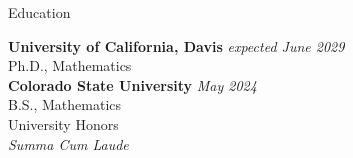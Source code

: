 \documentclass[
	11pt, %
]{resume} %
\begin{document}

%





\begin{rSection}{Education}

	\textbf{University of California, Davis} \hfill \textit{expected June 2029} \\ 
	Ph.D., Mathematics \\
	



	\textbf{Colorado State University} \hfill \textit{May 2024} \\ 
	B.S., Mathematics \\
	University Honors \\
	\textit{Summa Cum Laude} \\
	
\end{rSection}
\end{document}
